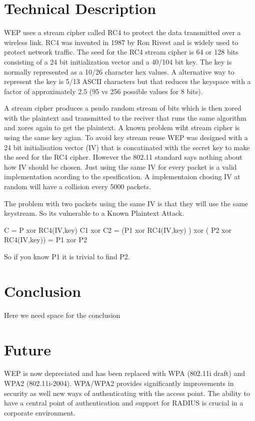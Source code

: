 \documentclass[twocolumn]{IEEEtran}
\begin{document}
\section {Technical Description}
\label{sec:technical_description}

WEP uses a stream cipher called RC4 to protect the data transmitted over a wireless link. RC4 was invented in 1987 by Ron Rivest and is widely used to protect network traffic. The seed for the RC4 stream cipher is 64 or 128 bits consisting of a 24 bit initialization vector and a 40/104 bit key. The key is normally represented as a 10/26 character hex values. A alternative way to represent the key is 5/13 ASCII characters but that reduces the keyspace with a factor of approximately 2.5 (95 vs 256 possible values for 8 bits).

A stream cipher produces a psudo random stream of bits which is then xored with the plaintext and transmitted to the reciver that runs the same algorithm and xores again to get the plaintext. A known problem wiht stream cipher is using the same key agian. To avoid key stream reuse WEP was designed with a 24 bit initialisation vector (IV) that is concatinated with the secret key to make the seed for the RC4 cipher. However the 802.11 standard says nothing about how IV should be chosen. Just using the same IV for every packet is a valid implementation acording to the spesification. A implementaion chosing IV at random will have a collision every 5000 packets. 

The problem with two packets using the same IV is that they will use the same keystream. So its vulnerable to a Known Plaintext Attack.

C = P xor RC4(IV,key)
C1 xor C2 = (P1 xor RC4(IV,key) ) xor ( P2 xor RC4(IV,key)) = P1 xor P2

So if you know P1 it is trivial to find P2. 

\section {Conclusion}
\label{sec:conclusion}

Here we need space for the conclusion



\section {Future}
\label{sec:future}

WEP is now depreciated and has been replaced with WPA (802.11i draft) and WPA2 (802.11i-2004). WPA/WPA2 provides significantly improvements in security as well new ways of authenticating with the access point. The ability to have a central point  of authentication and support for RADIUS is crucial in a corporate environment.






\end{document}
